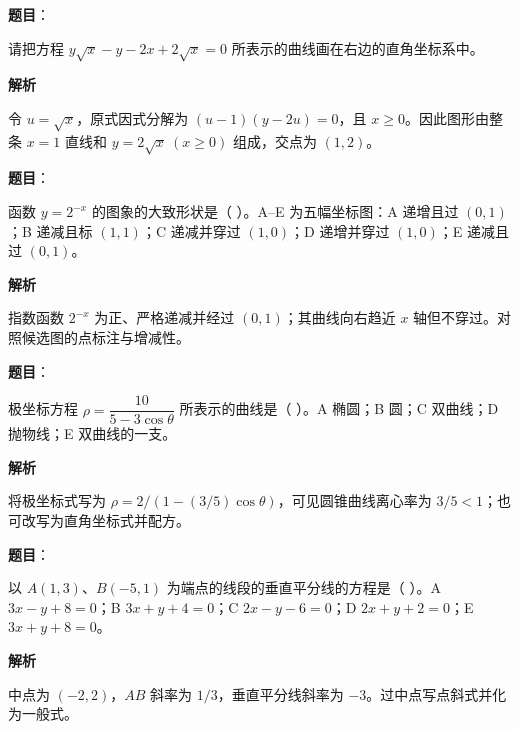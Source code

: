 \begin{answer}

\textbf{题目}：

请把方程 $y\sqrt{x}-y-2x+2\sqrt{x}=0$ 所表示的曲线画在右边的直角坐标系中。
\nopagebreak[4]
\begin{center}\end{center}
\nopagebreak[4]
\textbf{解析}

令 $u=\sqrt x$，原式因式分解为 $(u-1)(y-2u)=0$，且 $x\ge0$。因此图形由整条 $x=1$ 直线和 $y=2\sqrt x\ (x\ge0)$ 组成，交点为 $(1,2)$。


\end{answer}
\begin{answer}

\textbf{题目}：

函数 $y=2^{-x}$ 的图象的大致形状是（ ）。A–E 为五幅坐标图：A 递增且过 $(0,1)$；B 递减且标 $(1,1)$；C 递减并穿过 $(1,0)$；D 递增并穿过 $(1,0)$；E 递减且过 $(0,1)$。
\nopagebreak[4]
\begin{center}\end{center}
\nopagebreak[4]
\textbf{解析}

指数函数 $2^{-x}$ 为正、严格递减并经过 $(0,1)$；其曲线向右趋近 $x$ 轴但不穿过。对照候选图的点标注与增减性。


\end{answer}
\begin{answer}

\textbf{题目}：

极坐标方程 $\rho=\dfrac{10}{5-3\cos\theta}$ 所表示的曲线是（ ）。A 椭圆；B 圆；C 双曲线；D 抛物线；E 双曲线的一支。

\textbf{解析}

将极坐标式写为 $\rho=2/(1-(3/5)\cos\theta)$，可见圆锥曲线离心率为 $3/5<1$；也可改写为直角坐标式并配方。


\end{answer}
\begin{answer}

\textbf{题目}：

以 $A(1,3)$、$B(-5,1)$ 为端点的线段的垂直平分线的方程是（ ）。A $3x-y+8=0$；B $3x+y+4=0$；C $2x-y-6=0$；D $2x+y+2=0$；E $3x+y+8=0$。

\textbf{解析}

中点为 $(-2,2)$，$AB$ 斜率为 $1/3$，垂直平分线斜率为 $-3$。过中点写点斜式并化为一般式。


\end{answer}
